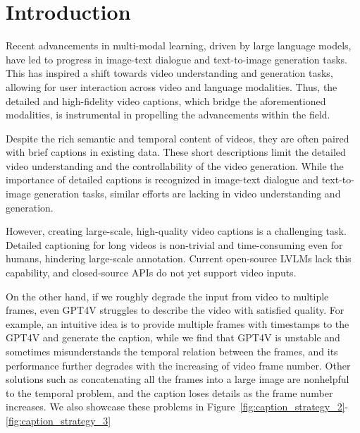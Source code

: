 \section{Introduction}
\label{sec:intro}
Recent advancements in multi-modal learning, driven by large language models, have led to progress in image-text dialogue\cite{liu2023improved,chen2023sharegpt4v,dong2024internlm,wang2023cogvlm,ye2023mplug,chen2023internvl,bai2023qwenvl,young2024yi} and text-to-image generation tasks\cite{betker2023improving,rombach2022high,chang2023muse,ruiz2023dreambooth,zhang2023adding,chen2023pixart}. This has inspired a shift towards video understanding\cite{lin2023video,ataallah2024minigpt4,li2023llama,zhang2023video,maaz2023video,luo2023valley} and generation tasks\cite{singer2022make,hong2022cogvideo,wu2023tune,wang2023lavie,blattmann2023stable,liu2024sora}, allowing for user interaction across video and language modalities. 
Thus, the detailed and high-fidelity video captions, which bridge the aforementioned modalities, is instrumental in propelling the advancements within the field.

Despite the rich semantic and temporal content of videos, they are often paired with brief captions in existing data. These short descriptions limit the detailed video understanding and the controllability of the video generation. While the importance of detailed captions is recognized in image-text dialogue\cite{chen2023sharegpt4v,chen2024allava,wang2023see} and text-to-image generation tasks\cite{chen2023pixart,dalle3}, similar efforts are lacking in video understanding and generation.

However, creating large-scale, high-quality video captions is a challenging task. Detailed captioning for long videos is non-trivial and time-consuming even for humans, hindering large-scale annotation. Current open-source LVLMs lack this capability, and closed-source APIs do not yet support video inputs. 

On the other hand, if we roughly degrade the input from video to multiple frames, even GPT4V struggles to describe the video with satisfied quality. For example, an intuitive idea is to provide multiple frames with timestamps to the GPT4V and generate the caption, while we find that GPT4V is unstable and sometimes misunderstands the temporal relation between the frames, and its performance further degrades with the increasing of video frame number. Other solutions such as concatenating all the frames into a large image are nonhelpful to the temporal problem, and the caption loses details as the frame number increases. We also showcase these problems in Figure~\ref{fig:caption_strategy_2}-\ref{fig:caption_strategy_3}


